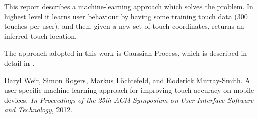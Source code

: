 \documentclass[english,11pt]{article}
\numberwithin{equation}{section}
\begin{document}
This report describes a machine-learning approach which solves the problem. In
highest level it learns user behaviour by having some training touch data (300
touches per user), and then, given a new set of touch coordinates, returns an
inferred touch location.

The approach adopted in this work is Gaussian Process, which is described in
detail in \cite{WeiRogMur}.

\clearpage

\begin{thebibliography}{9}

    Daryl Weir, Simon Rogers, Markus L\"ochtefeld, and Roderick Murray-Smith. A
    user-specific machine learning approach for improving touch accuracy on
    mobile devices. \emph{In Proceedings of the 25th ACM Symposium on User
    Interface Software and Technology}, 2012.

\end{thebibliography}
\end{document}
